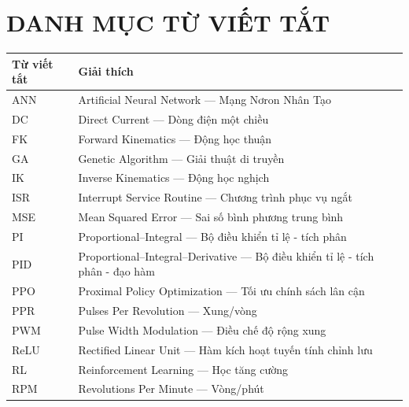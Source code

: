 
\chapter*{DANH MỤC TỪ VIẾT TẮT}

\begingroup
{}
\fontsize{13pt}{15.6pt}\selectfont
\setlength{\parskip}{6pt}
\setlength{\parindent}{0pt}

\renewcommand{\arraystretch}{1.4}
\begin{tabular}{@{} p{3.5cm} p{11cm} @{}}
\textbf{Từ viết tắt} & \textbf{Giải thích} \\
\hline
ANN     & Artificial Neural Network — Mạng Nơron Nhân Tạo \\
DC      & Direct Current — Dòng điện một chiều \\
FK      & Forward Kinematics — Động học thuận \\
GA      & Genetic Algorithm — Giải thuật di truyền \\
IK      & Inverse Kinematics — Động học nghịch \\
ISR     & Interrupt Service Routine — Chương trình phục vụ ngắt \\
MSE     & Mean Squared Error — Sai số bình phương trung bình \\
PI      & Proportional–Integral — Bộ điều khiển tỉ lệ - tích phân \\
PID     & Proportional–Integral–Derivative — Bộ điều khiển tỉ lệ - tích phân - đạo hàm \\
PPO     & Proximal Policy Optimization — Tối ưu chính sách lân cận \\
PPR     & Pulses Per Revolution — Xung/vòng \\
PWM     & Pulse Width Modulation — Điều chế độ rộng xung \\
ReLU    & Rectified Linear Unit — Hàm kích hoạt tuyến tính chỉnh lưu \\
RL      & Reinforcement Learning — Học tăng cường \\
RPM     & Revolutions Per Minute — Vòng/phút \\
\end{tabular}

\endgroup
